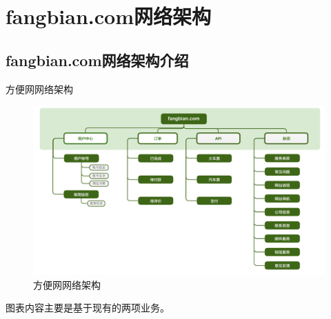 \section{fangbian.com网络架构}

\subsection{fangbian.com网络架构介绍}
\par 方便网网络架构
\begin{figure}[H]
	\centering
	\includegraphics[width=1.0\textwidth]{graphics/fangbian.pdf}
	\caption{方便网网络架构}
	\label{fig:fb}
\end{figure}

\par 图表内容主要是基于现有的两项业务。


